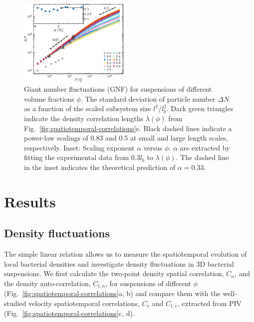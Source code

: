 \documentclass[twocolumn,aps,prx,amsmath,amssymb,longbibliography]{revtex4-2}
\begin{document}
\begin{figure}[t]
\begin{center}
\includegraphics[width=0.47\textwidth]{figures/GNF/v6.pdf}
\caption[Concentration dependence of GNF.]
{
Giant number fluctuations (GNF) for suspensions of different volume fractions $\phi$. The standard deviation of particle number $\Delta N$
as a function of the scaled subsystem size $l^2/l_b^2$. Dark green triangles indicate the density correlation lengths $\lambda(\phi)$ from Fig.~\ref{fig:spatiotemporal-correlations}e. Black dashed lines indicate a power-law scalings of 0.83 and 0.5 at small and large length scales, respectively.
Inset: Scaling exponent $\alpha$ versus $\phi$. $\alpha$ are extracted by fitting the experimental data from 0.3$l_b$ to $\lambda(\phi)$. The dashed line in the inset indicates the theoretical prediction of $\alpha=0.33$.
}
\label{fig:GNF}
\end{center}
\end{figure}

\section{Results}

\subsection{Density fluctuations}

The simple linear relation allows us to measure the spatiotemporal evolution of local bacterial densities and investigate density fluctuations in 3D bacterial suspensions. We first calculate the two-point density spatial correlation, $C_n$, and the density auto-correlation, $C_{t,n}$, for suspensions of different $\phi$ (Fig.~\ref{fig:spatiotemporal-correlations}a, b) and compare them with the well-studied velocity spatiotemporal correlations, $C_{v}$ and $C_{t,v}$, extracted from PIV (Fig.~\ref{fig:spatiotemporal-correlations}c, d).
\end{document}

